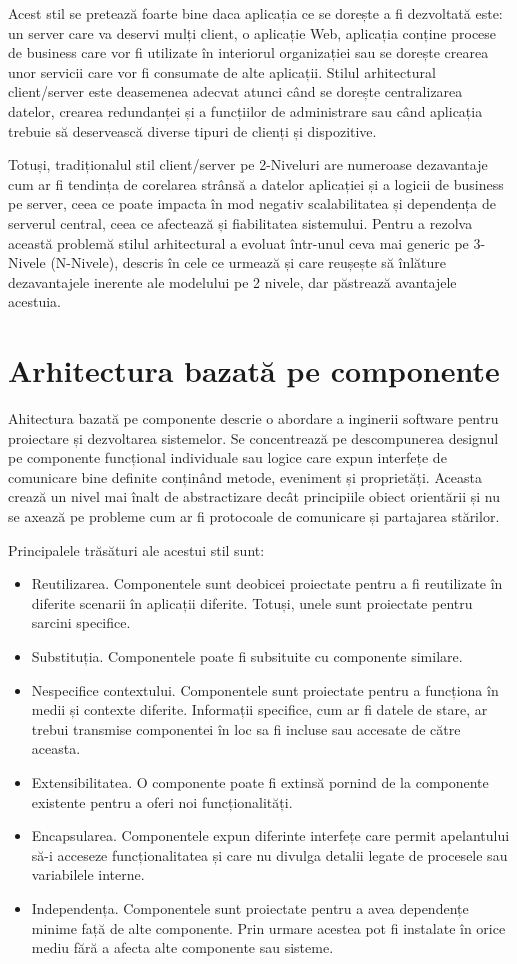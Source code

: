 \documentclass[12pt, a4paper, oneside, romanian]{teza-upb}
\begin{document}
Acest stil se pretează foarte bine daca aplicația ce se dorește a fi dezvoltată este: un server care va deservi mulți client, o aplicație Web, aplicația conține procese de business care vor fi utilizate în interiorul organizației sau se dorește crearea unor servicii care vor fi consumate de alte aplicații. Stilul arhitectural client/server este deasemenea adecvat atunci când se dorește centralizarea datelor, crearea redundanței și a funcțiilor de administrare sau când aplicația trebuie să deservească diverse tipuri de clienți și dispozitive. 

Totuși, tradiționalul stil client/server pe 2-Niveluri are numeroase dezavantaje cum ar fi tendința de corelarea strânsă a datelor aplicației și a logicii de business pe server, ceea ce poate impacta în mod negativ scalabilitatea și dependența de serverul central, ceea ce afectează și fiabilitatea sistemului. Pentru a rezolva această problemă stilul arhitectural a evoluat într-unul ceva mai generic pe 3-Nivele (N-Nivele), descris în cele ce urmează și care reușește să înlăture dezavantajele inerente ale modelului pe 2 nivele, dar păstrează avantajele acestuia.

\section{Arhitectura bazată pe componente}
Ahitectura bazată pe componente descrie o abordare a inginerii software pentru proiectare și dezvoltarea sistemelor. Se concentrează pe descompunerea designul pe componente funcțional individuale sau logice care expun interfețe de comunicare bine definite conținând metode, eveniment și proprietăți. Aceasta crează un nivel mai înalt de abstractizare decât principiile obiect orientării și nu se axează pe probleme cum ar fi protocoale de comunicare și partajarea stărilor.

Principalele trăsături ale acestui stil sunt:
\begin{itemize}
 \item Reutilizarea. Componentele sunt deobicei proiectate pentru a fi reutilizate în diferite scenarii în aplicații diferite. Totuși, unele sunt proiectate pentru sarcini specifice.
 \item Substituția. Componentele poate fi subsituite cu componente similare. 
 \item Nespecifice contextului. Componentele sunt proiectate pentru a funcționa în medii și contexte diferite. Informații specifice, cum ar fi datele de stare, ar trebui transmise componentei în loc sa fi incluse sau accesate de către aceasta.
 \item Extensibilitatea. O componente poate fi extinsă pornind de la componente existente pentru a oferi noi funcționalități.
 \item Encapsularea. Componentele expun diferinte interfețe care permit apelantului să-i acceseze funcționalitatea și care nu divulga detalii legate de procesele sau variabilele interne.
 \item Independența. Componentele sunt proiectate pentru a avea dependențe minime față de alte componente. Prin urmare acestea pot fi instalate în orice mediu fără a afecta alte componente sau sisteme.
\end{itemize}
\end{document}

